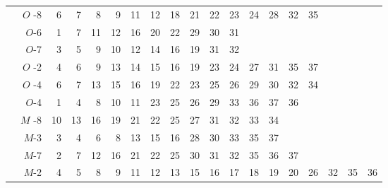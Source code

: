 \begin{table}[H]
{\begin{tabular}{|r|r|r|r|r|r|r|r|r|r|r|r|r|r|r|r|r|r|r|}
				\cmidrule{2-19}          &$O$ -8    & 6     & 7     & 8     & 9     & 11    & 12    & 18    & 21    & 22    & 23    & 24    & 28    & 32    & 35    &       &       &  \\
				\cmidrule{2-19}          & $O$-6    & 1     & 7     & 11    & 12    & 16    & 20    & 22    & 29    & 30    & 31    &       &       &       &       &       &       &  \\
				\cmidrule{2-19}          & $O$-7    & 3     & 5     & 9     & 10    & 12    & 14    & 16    & 19    & 31    & 32    &       &       &       &       &       &       &  \\
				\cmidrule{2-19}          &$O$ -2    & 4     & 6     & 9     & 13    & 14    & 15    & 16    & 19    & 23    & 24    & 27    & 31    & 35    & 37    &       &       &  \\
				\cmidrule{2-19}          &$O$ -4    & 6     & 7     & 13    & 15    & 16    & 19    & 22    & 23    & 25    & 26    & 29    & 30    & 32    & 34    &       &       &  \\
				\cmidrule{2-19}          & $O$-4    & 1     & 4     & 8     & 10    & 11    & 23    & 25    & 26    & 29    & 33    & 36    & 37    & 36    &       &       &       &  \\
				\cmidrule{2-19}          &$M$ -8    & 10    & 13    & 16    & 19    & 21    & 22    & 25    & 27    & 31    & 32    & 33    & 34    &       &       &       &       &  \\
				\cmidrule{2-19}          & $M$-3    & 3     & 4     & 6     & 8     & 13    & 15    & 16    & 28    & 30    & 33    & 35    & 37    &       &       &       &       &  \\
				\cmidrule{2-19}          & $M$-7    & 2     & 7     & 12    & 16    & 21    & 22    & 25    & 30    & 31    & 32    & 35    & 36    & 37    &       &       &       &  \\
				\cmidrule{2-19}          & $M$-2    & 4     & 5     & 8     & 9     & 11    & 12    & 13    & 15    & 16    & 17    & 18    & 19    & 20    & 26    & 32    & 35    & 36 \\
				\bottomrule
			\end{tabular}%
		}
		\label{tab:addlabel}%
	\end{table}%
	


